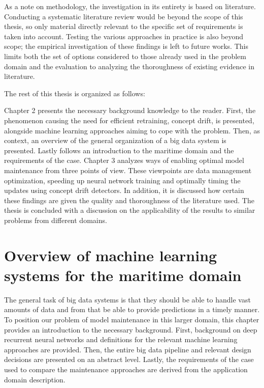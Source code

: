 As a note on methodology, the investigation in its entirety is based on literature. Conducting a systematic literature review would be beyond the scope of this thesis, so only material directly relevant to the specific set of requirements is taken into account. Testing the various approaches in practice is also beyond scope; the empirical investigation of these findings is left to future works. This limits both the set of options considered to those already used in the problem domain and the evaluation to analyzing the thoroughness of existing evidence in literature.


The rest of this thesis is organized as follows:

Chapter 2 presents the necessary background knowledge to the reader. First, the phenomenon causing the need for efficient retraining, concept drift, is presented, alongside machine learning approaches aiming to cope with the problem. Then, as context, an overview of the general organization of a big data system is presented. Lastly follows an introduction to the maritime domain and the requirements of the case. Chapter 3 analyzes ways of enabling optimal model maintenance from three points of view. These viewpoints are data management optimization, speeding up neural network training and optimally timing the updates using concept drift detectors. In addition, it is discussed how certain these findings are given the quality and thoroughness of the literature used. The thesis is concluded with a discussion on the applicability of the results to similar problems from different domains.

\chapter[Overview of machine learning systems for the maritime domain]{Overview of machine learning\\ systems for the maritime domain}


The general task of big data systems is that they should be able to handle vast amounts of data and from that be able to provide predictions in a timely manner. To position our problem of model maintenance in this larger domain, this chapter provides an introduction to the necessary background. First, background on deep recurrent neural networks and definitions for the relevant machine learning approaches are provided. Then, the entire big data pipeline and relevant design decisions are presented on an abstract level. Lastly, the requirements of the case used to compare the maintenance approaches are derived from the application domain description.

